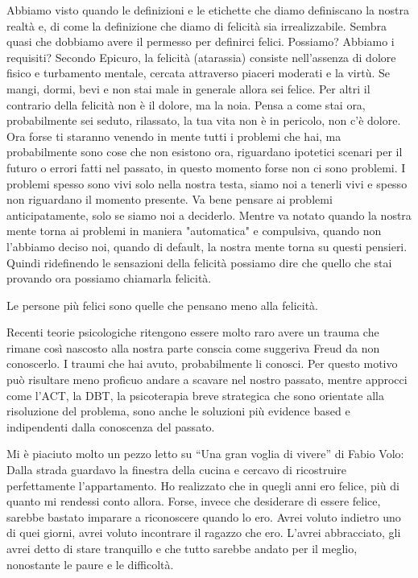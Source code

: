 \documentclass[12pt]{book} %
\begin{document}
Abbiamo visto quando le definizioni e le etichette che diamo definiscano la nostra realtà e, di come la definizione che
diamo di felicità sia irrealizzabile. Sembra quasi che dobbiamo avere il permesso per definirci felici. Possiamo?
Abbiamo i requisiti? Secondo Epicuro, la felicità (atarassia) consiste nell’assenza di dolore fisico e turbamento mentale, cercata attraverso piaceri moderati e la virtù. Se mangi, dormi, bevi e non 
stai male in generale allora sei felice. Per altri il contrario della felicità non è il dolore, ma la noia. Pensa a
come stai ora, probabilmente sei seduto, rilassato, la tua vita non è in pericolo, non c'è dolore.
Ora forse ti staranno venendo in mente tutti i problemi che hai, ma probabilmente sono cose che non
esistono ora, riguardano ipotetici scenari per il futuro o errori fatti nel passato, in questo momento forse non ci sono
problemi. I problemi spesso sono vivi solo nella nostra testa, siamo noi a tenerli vivi e spesso non riguardano il
momento presente. Va bene pensare ai problemi anticipatamente, solo se siamo noi a deciderlo. Mentre va notato quando la nostra mente torna ai problemi in maniera "automatica" e compulsiva, quando non l'abbiamo deciso noi, quando di default, la nostra mente torna su questi pensieri.
Quindi ridefinendo le sensazioni della felicità possiamo dire che quello che stai provando ora possiamo chiamarla felicità. 

Le persone più felici sono quelle che pensano meno alla felicità.

Recenti teorie psicologiche ritengono essere molto raro avere un trauma che rimane così nascosto alla nostra parte conscia come
suggeriva Freud da non conoscerlo. I traumi che hai avuto, probabilmente li conosci. Per questo motivo può risultare
meno proficuo andare a scavare nel nostro passato, mentre approcci come l'ACT, la DBT, la psicoterapia breve strategica
che sono orientate alla risoluzione del problema, sono anche le soluzioni più evidence based e indipendenti dalla
conoscenza del passato.

Mi è piaciuto molto un pezzo letto su “Una gran voglia di vivere” di
Fabio Volo: Dalla strada guardavo la finestra della cucina e cercavo di ricostruire perfettamente
l'appartamento. Ho realizzato che in quegli anni ero felice, più di quanto mi rendessi conto
allora. Forse, invece che desiderare di essere felice, sarebbe bastato imparare a riconoscere quando lo ero. Avrei
voluto indietro uno di quei giorni, avrei voluto incontrare il ragazzo che ero. L'avrei
abbracciato, gli avrei detto di stare tranquillo e che tutto sarebbe andato per il meglio, nonostante le paure e le
difficoltà. 
\end{document}
